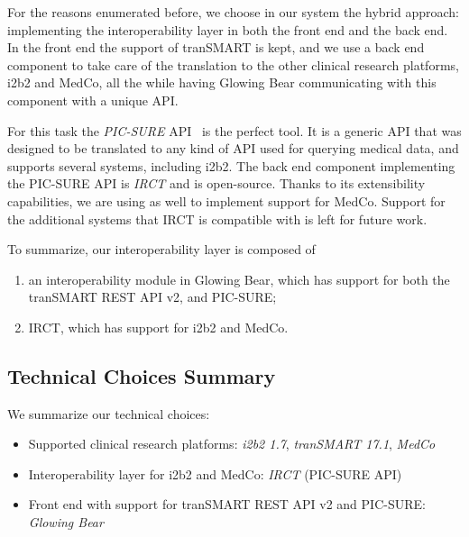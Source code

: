 For the reasons enumerated before, we choose in our system the hybrid approach: implementing the interoperability layer in both the front end and the back end.
In the front end the support of tranSMART is kept, and we use a back end component to take care of the translation to the other clinical research platforms, i2b2 and MedCo, all the while having Glowing Bear communicating with this component with a unique API.

For this task the \emph{PIC-SURE} API~\cite{todo} is the perfect tool.
It is a generic API that was designed to be translated to any kind of API used for querying medical data, and supports several systems, including i2b2.
The back end component implementing the PIC-SURE API is \emph{IRCT} and is open-source.
Thanks to its extensibility capabilities, we are using as well to implement support for MedCo.
Support for the additional systems that IRCT is compatible with is left for future work.

To summarize, our interoperability layer is composed of 
\begin{enumerate}
    \item an interoperability module in  Glowing Bear, which has support for both the tranSMART REST API v2, and PIC-SURE;
    \item IRCT, which has support for i2b2 and MedCo.
\end{enumerate} 

\subsection{Technical Choices Summary}

We summarize our technical choices:

\begin{itemize}
    \setlength\itemsep{0em}
    \item Supported clinical research platforms: \emph{i2b2 1.7}, \emph{tranSMART 17.1}, \emph{MedCo}
    \item Interoperability layer for i2b2 and MedCo: \emph{IRCT} (PIC-SURE API)
    \item Front end with support for tranSMART REST API v2 and PIC-SURE: \emph{Glowing Bear}
\end{itemize}


